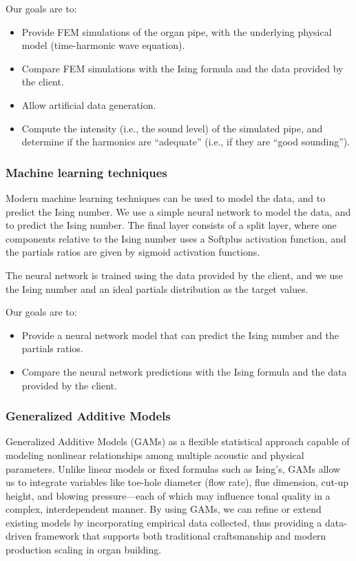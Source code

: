 \documentclass{psu-plan}
\begin{document}
Our goals are to:
\begin{itemize}
    \item Provide FEM simulations of the organ pipe, with the underlying
        physical model (time-harmonic wave equation).
    \item Compare FEM simulations with the Ising formula and the data provided by
        the client.
    \item Allow artificial data generation.
    \item Compute the intensity (i.e., the sound level) of the simulated pipe,
        and determine if the harmonics are ``adequate'' (i.e., if they are
        ``good sounding'').
\end{itemize}


\subsubsection{Machine learning techniques}

Modern machine learning techniques can be used to model the data, and to
predict the Ising number.
We use a simple neural network to model the data, and to predict the Ising
number.
The final layer consists of a split layer, where one components relative to the
Ising number uses a Softplus activation function, and the
partials ratios are given by sigmoid activation functions.

The neural network is trained using the data provided by the client, and we
use the Ising number and an ideal partials distribution as the target
values.

Our goals are to:
\begin{itemize}
    \item Provide a neural network model that can predict the Ising number and
        the partials ratios.
    \item Compare the neural network predictions with the Ising formula and the
        data provided by the client.
\end{itemize}

\subsubsection{Generalized Additive Models}

Generalized Additive Models (GAMs) as a flexible statistical approach capable
of modeling nonlinear relationships among multiple acoustic and physical
parameters.
Unlike linear models or fixed formulas such as Ising’s, GAMs allow us to
integrate variables like toe-hole diameter (flow rate),
flue dimension, cut-up height, and blowing pressure—each of which may influence
tonal quality in a complex, interdependent manner.
By using GAMs, we can refine or extend existing models by incorporating
empirical data collected, thus providing a data-driven framework that supports
both traditional craftsmanship and modern production scaling in organ building.
\end{document}
